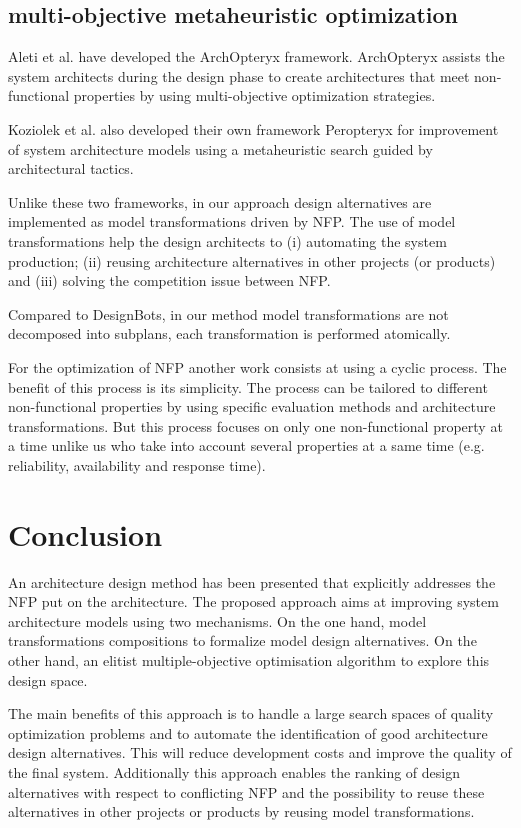 \documentclass[conference]{IEEEtran}
\begin{document}
\subsection{multi-objective metaheuristic optimization}
Aleti et al.\cite{Gr5069138} have developed the ArchOpteryx framework. ArchOpteryx assists the system architects during the design phase to create architectures that meet non-functional properties by using multi-objective optimization strategies. 

Koziolek et al.\cite{Koziolek:2011:PAA:2000259.2000267} also developed their own framework Peropteryx for improvement of system architecture models using a metaheuristic search guided by architectural tactics.

Unlike these two frameworks, in our approach design alternatives are implemented as model transformations driven by NFP. The use of model transformations help the design architects to (i) automating the system production; (ii) reusing architecture alternatives in other projects (or products) and (iii) solving the competition issue between NFP. 

Compared to DesignBots\cite{Diaz-Pace:2007:UPT:1784860.1784865}, in our method model transformations are not decomposed into subplans, each transformation is performed atomically.

For the optimization of NFP another work consists at using a cyclic process\cite{Bosch99softwarearchitecture}. The benefit of this process is its simplicity. The process can be tailored to different non-functional properties by using specific evaluation methods and architecture transformations. But this process focuses on only one non-functional property at a time unlike us who take into account several properties at a same time (e.g. reliability, availability and response time).

\section{Conclusion}
\label{Conclu}
An architecture design method has been presented that explicitly addresses the NFP put on the architecture. The proposed approach aims at improving system architecture models using two mechanisms. On the one hand, model transformations compositions to formalize model design alternatives. On the other hand, an elitist multiple-objective optimisation algorithm to explore this design space.

The main benefits of this approach is to handle a large search spaces of quality optimization problems and to automate the identification of good architecture design alternatives. This will reduce development costs and improve the quality of the final system. Additionally this approach enables the ranking of design alternatives with respect to conflicting NFP and the possibility to reuse these alternatives in other projects or products by reusing model transformations.
\end{document}
